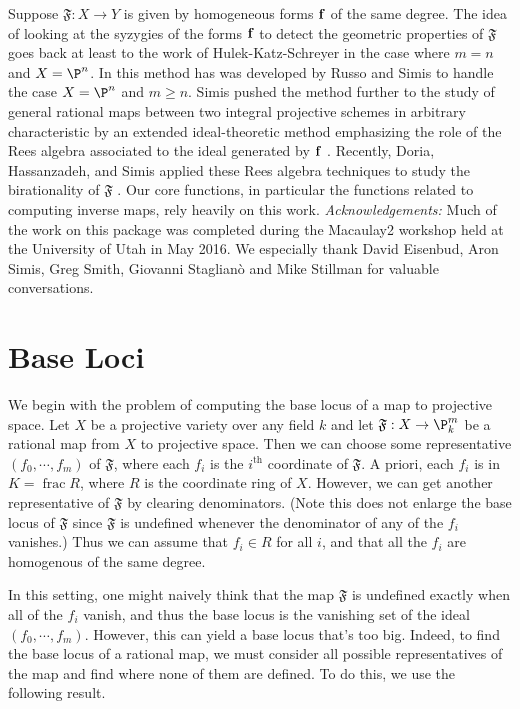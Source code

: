 \documentclass[11pt]{amsart}
\numberwithin{equation}{theorem}
\def\ff{{\bf f}}
\renewcommand{\:}{\colon}
\DeclareMathOperator{\ffield}{frac} %
\theoremstyle{theorem}
\begin{document}
Suppose $\mathfrak{F} : X \to Y$ is given by homogeneous forms $\ff$ of the same degree.
The idea of looking at the syzygies of the forms $\ff$ to detect the geometric properties of  $\mathfrak{F}$ goes
back at least to the work of Hulek-Katz-Schreyer \cite{HulekKatzSchreyer} in the case
where $m=n$ and $X=\P^n$. In \cite{RussoSimisCompositio}  this method has was developed by Russo and Simis
to handle the case $X=\P^n$ and $m\geq n$. Simis pushed the method further to the study
of general rational maps between two integral projective schemes in
arbitrary characteristic by an extended ideal-theoretic method
emphasizing the role of the Rees algebra associated to the ideal
generated by $\ff$ \cite{SimisCremona}.  Recently,  Doria, Hassanzadeh, and Simis applied these
 Rees algebra techniques to study the birationality of  $\mathfrak{F}$ \cite{DoriaHassanzadehSimisBirationality}.  Our core functions, in particular the functions related to computing inverse maps, rely heavily on this work.
\vskip 12pt
\noindent
\emph{Acknowledgements:}  Much of the work  on this package was completed during the Macaulay2 workshop held at the University of Utah in May 2016.  We especially thank David Eisenbud, Aron Simis, Greg Smith, Giovanni Staglian\`o and Mike Stillman for valuable conversations.



\section{Base Loci}

We begin with the problem of computing the base locus of a map to projective space. Let $X$ be a projective variety over any field $k$ and let $\mathfrak{F}: X \to \P_k^m$ be a rational map from $X$ to projective space. Then we can choose some representative $(f_0, \cdots, f_m)$ of $\mathfrak{F}$, where each $f_i$ is the $i^{\textrm{th}}$ coordinate of $\mathfrak{F}$. A priori, each $f_i$ is in $K = \ffield R$, where $R$ is the coordinate ring of $X$. However, we can get another representative of $\mathfrak{F}$ by clearing denominators. (Note this does not enlarge the base locus of $\mathfrak{F}$ since $\mathfrak{F}$ is undefined whenever the denominator of any of the $f_i$ vanishes.) Thus we can assume that $f_i\in R$ for all $i$, and that all the $f_i$ are homogenous of the same degree.

In this setting, one might naively think that the map $\mathfrak{F}$ is undefined exactly when all of the $f_i$ vanish, and thus the base locus is the vanishing set of the ideal $(f_0, \cdots, f_m)$. However, this can yield a base locus that's too big.  Indeed, to find the base locus of a rational map, we must consider all possible representatives of the map and find where none of them are defined. To do this, we use the following result.
\end{document}
